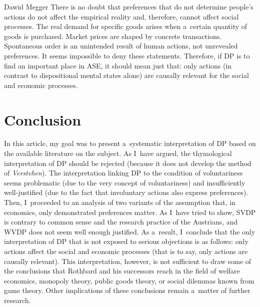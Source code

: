 \begin{artengenv}{Dawid Megger}
There is no doubt that preferences that do not determine people's actions do not affect the empirical reality and, therefore, cannot affect social processes. The real demand for specific goods arises when a~certain quantity of goods is purchased. Market prices are shaped by concrete transactions. Spontaneous order is an unintended result of human actions, not unrevealed preferences. It seems impossible to deny these statements. Therefore, if DP is to find an important place in ASE, it should mean just that: only actions (in contrast to dispositional mental states alone) are causally relevant for the social and economic processes.



\section{Conclusion}

In this article, my goal was to present a~systematic interpretation of DP based on the available literature on the subject. As I~have argued, the thymological interpretation of DP should be rejected (because it does not develop the method of \textit{Verstehen}). The interpretation linking DP to the condition of voluntariness seems problematic (due to the very concept of voluntariness) and insufficiently well-justified (due to the fact that involuntary actions also express preferences). Then, I~proceeded to an analysis of two variants of the assumption that, in economics, only demonstrated preferences matter. As I~have tried to show, SVDP is contrary to common sense and the research practice of the Austrians, and WVDP does not seem well enough justified. As a~result, I~conclude that the only interpretation of DP that is not exposed to serious objections is as follows: only actions affect the social and economic processes (that is to say, only actions are causally relevant). This interpretation, however, is not sufficient to draw some of the conclusions that Rothbard and his successors reach in the field of welfare economics, monopoly theory, public goods theory, or social dilemmas known from game theory. Other implications of these conclusions remain a~matter of further research.



\end{artengenv}

\label{megger-last}
